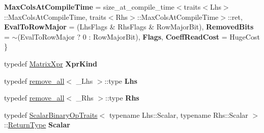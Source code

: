 \begin{DoxyCompactItemize}
{\bfseries Max\+Cols\+At\+Compile\+Time} = size\+\_\+at\+\_\+compile\+\_\+time$<$traits$<$Lhs$>$\+:\+:Max\+Cols\+At\+Compile\+Time, traits$<$Rhs$>$\+:\+:Max\+Cols\+At\+Compile\+Time$>$\+:\+:ret, 
{\bfseries Eval\+To\+Row\+Major} = (Lhs\+Flags \& Rhs\+Flags \& Row\+Major\+Bit), 
{\bfseries Removed\+Bits} = $\sim$(Eval\+To\+Row\+Major ? 0 \+: Row\+Major\+Bit), 
\newline
{\bfseries Flags}, 
{\bfseries Coeff\+Read\+Cost} = Huge\+Cost
 \}
\item 
\mbox{\label{struct_eigen_1_1internal_1_1traits_3_01_kronecker_product_sparse_3_01___lhs_00_01___rhs_01_4_01_4_a996450f73c890690ea9352e359687051}} 
typedef \hyperlink{struct_eigen_1_1_matrix_xpr}{Matrix\+Xpr} {\bfseries Xpr\+Kind}
\item 
\mbox{\label{struct_eigen_1_1internal_1_1traits_3_01_kronecker_product_sparse_3_01___lhs_00_01___rhs_01_4_01_4_a65604fef861f55abaae9bb5d2a3f1b0d}} 
typedef \hyperlink{struct_eigen_1_1internal_1_1remove__all}{remove\+\_\+all}$<$ \+\_\+\+Lhs $>$\+::type {\bfseries Lhs}
\item 
\mbox{\label{struct_eigen_1_1internal_1_1traits_3_01_kronecker_product_sparse_3_01___lhs_00_01___rhs_01_4_01_4_a24c9abd6946cab3b5df78c6135f7128d}} 
typedef \hyperlink{struct_eigen_1_1internal_1_1remove__all}{remove\+\_\+all}$<$ \+\_\+\+Rhs $>$\+::type {\bfseries Rhs}
\item 
\mbox{\label{struct_eigen_1_1internal_1_1traits_3_01_kronecker_product_sparse_3_01___lhs_00_01___rhs_01_4_01_4_a26da8c98571ee9451b95e774507ba355}} 
typedef \hyperlink{group___core___module_struct_eigen_1_1_scalar_binary_op_traits}{Scalar\+Binary\+Op\+Traits}$<$ typename Lhs\+::\+Scalar, typename Rhs\+::\+Scalar $>$\+::\hyperlink{group___sparse_core___module_class_eigen_1_1_sparse_matrix}{Return\+Type} {\bfseries Scalar}
\item 
\mbox{\label{struct_eigen_1_1internal_1_1traits_3_01_kronecker_product_sparse_3_01___lhs_00_01___rhs_01_4_01_4_a1dd945a0f986623e82aba647e8e3819b}} 

\end{DoxyCompactItemize}
